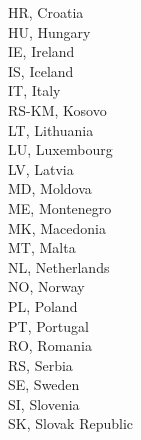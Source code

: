 \documentclass[preprint,12pt,authoryear]{elsarticle}
\begin{document}
		HR, Croatia\\ \noindent\hspace*{20mm}%
		HU, Hungary\\ \noindent\hspace*{20mm}%
		IE, Ireland\\ \noindent\hspace*{20mm}%
		IS, Iceland\\ \noindent\hspace*{20mm}%
		IT, Italy\\ \noindent\hspace*{20mm}%
		RS-KM, Kosovo\\ \noindent\hspace*{20mm}%
		LT, Lithuania\\ \noindent\hspace*{20mm}%
		LU, Luxembourg\\ \noindent\hspace*{20mm}%
		LV, Latvia\\ \noindent\hspace*{20mm}%
		MD, Moldova\\ \noindent\hspace*{20mm}%
		ME, Montenegro\\ \noindent\hspace*{20mm}%
		MK, Macedonia\\ \noindent\hspace*{20mm}%
		MT, Malta\\ \noindent\hspace*{20mm}%
		NL, Netherlands\\ \noindent\hspace*{20mm}%
		NO, Norway\\ \noindent\hspace*{20mm}%
		PL, Poland\\ \noindent\hspace*{20mm}%
		PT, Portugal\\ \noindent\hspace*{20mm}%
		RO, Romania\\ \noindent\hspace*{20mm}%
		RS, Serbia\\ \noindent\hspace*{20mm}%
		SE, Sweden\\ \noindent\hspace*{20mm}%
		SI, Slovenia\\ \noindent\hspace*{20mm}%
		SK, Slovak Republic\\ \noindent\hspace*{20mm}%
\end{document}
